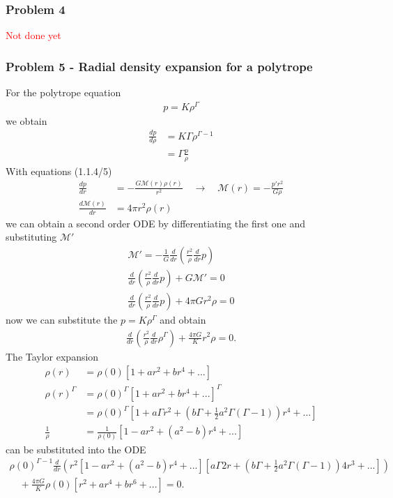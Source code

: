 \documentclass[10pt,a4paper]{article}
\theoremstyle{definition}
\begin{document}
\subsubsection{Problem 4}
\textcolor{red}{Not done yet}

\subsubsection{Problem 5 - Radial density expansion for a polytrope}
For the polytrope equation 
\begin{align}
    p=K\rho^\Gamma
\end{align}
we obtain
\begin{align}
    \frac{dp}{d\rho}&=K\Gamma\rho^{\Gamma-1}\\
    &=\Gamma\frac{p}{\rho}
\end{align}
With equations (1.1.4/5)
\begin{align}
    \frac{dp}{dr}   &= -\frac{G\mathcal{M}(r)\rho(r)}{r^2}\quad\rightarrow\quad\mathcal{M}(r)=-\frac{p'r^2}{G\rho}\\
    \frac{d\mathcal{M}(r)}{dr} &= 4\pi r^2\rho(r)
\end{align}
we can obtain a second order ODE by differentiating the first one and substituting $\mathcal{M}'$
\begin{align}
    \mathcal{M}'=-\frac{1}{G}\frac{d}{dr}\left(\frac{r^2}{\rho}\frac{d}{dr}p\right)\\
    \frac{d}{dr}\left(\frac{r^2}{\rho}\frac{d}{dr}p\right)+G\mathcal{M}'=0\\
    \frac{d}{dr}\left(\frac{r^2}{\rho}\frac{d}{dr}p\right)+4\pi Gr^2\rho=0
\end{align}
now we can substitute the $p=K\rho^\Gamma$ and obtain
\begin{align}
    \frac{d}{dr}\left(\frac{r^2}{\rho}\frac{d}{dr}\rho^\Gamma\right)+\frac{4\pi G}{K}r^2\rho=0.
\end{align}
The Taylor expansion 
\begin{align}
    \rho(r)&=\rho(0)\left[1+ar^2+br^4+...\right]\\
    \rho(r)^\Gamma&=\rho(0)^\Gamma\left[1+ar^2+br^4+...\right]^\Gamma\\
    &=\rho(0)^\Gamma\left[1+a\Gamma r^2+\left(b\Gamma+\frac{1}{2}a^2\Gamma(\Gamma-1)\right)r^4+...\right]\\
    \frac{1}{\rho}&=\frac{1}{\rho(0)}\left[1-a r^2+(a^2-b)r^4+...\right]
\end{align}
can be substituted into the ODE
\begin{align}
    \rho(0)^{\Gamma-1}\frac{d}{dr}\left(r^2\left[1-a r^2+(a^2-b)r^4+...\right]\left[a\Gamma 2r+\left(b\Gamma+\frac{1}{2}a^2\Gamma(\Gamma-1)\right)4r^3+...\right]\right)\\
    \quad+\frac{4\pi G}{K}\rho(0)\left[r^2+ar^4+br^6+...\right]=0.
\end{align}
\end{document}
